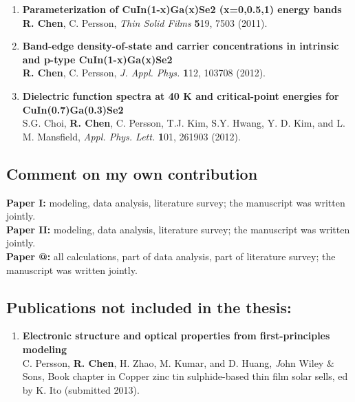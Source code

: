 \documentclass[a4paper, 12pt, titlepage,oneside,drop]{kthesis}
\makeatletter
\newcommand{\Rmnum}[1]{\expandafter\@slowromancap\romannumeral #1@}
\makeatother
\begin{document}
\begin{enumerate}
\renewcommand{\labelenumi}{\Roman{enumi}}
\item{} \textbf{Parameterization of CuIn(1-x)Ga(x)Se2 (x=0,0.5,1) energy bands }
\\\textbf{R. Chen}, C. Persson, \textit{Thin Solid Films} {\textbf 519}, 7503 (2011).

\item{}\textbf{Band-edge density-of-state and carrier concentrations in intrinsic and p-type CuIn(1-x)Ga(x)Se2}
\\\textbf{R. Chen}, C. Persson, \textit{J. Appl. Phys.} {\textbf 112}, 103708 (2012).

\item{} \textbf{Dielectric function spectra at 40 K and critical-point energies for CuIn(0.7)Ga(0.3)Se2}
\\ S.G. Choi, \textbf{R. Chen}, C. Persson, T.J. Kim, S.Y. Hwang, Y. D. Kim, and L. M. Mansfield,
\textit{Appl. Phys. Lett. } {\textbf 101}, 261903 (2012).

\end{enumerate}
\subsection*{Comment on my own contribution}

\textbf{Paper I:} modeling, data analysis, literature survey;
the manuscript was written jointly.\\
\textbf{Paper II:} modeling, data analysis, literature survey; the manuscript was
written jointly.\\
\textbf{Paper \Rmnum{3}:} all calculations, part of data analysis, part of literature survey;
the manuscript was written jointly.\\

\subsection*{Publications not included in the thesis:}
\begin{enumerate}
\renewcommand{\labelenumi}{\Roman{enumi}}
\setcounter{enumi}{3}

\item{}\textbf{Electronic structure and optical properties from first-principles modeling}
\\C. Persson, \textbf{R. Chen}, H. Zhao, M. Kumar, and D. Huang, {\textit John Wiley $\&$ Sons}, {Book chapter in Copper zinc tin sulphide-based thin film solar sells, ed by K. Ito} (submitted 2013).


\end{enumerate}
\end{document}
